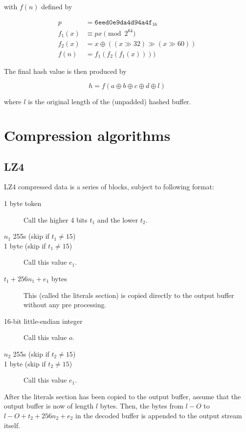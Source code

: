 \documentclass[11pt,a4paper]{report}
\begin{document}
        with $f(n)$ defined by

        \begin{align*}
            p      &=      \texttt{6eed0e9da4d94a4f}_{16} \\
            f_1(x) &\equiv px \pmod{2^{64}} \\
            f_2(x) &=      x \oplus ((x \gg 32) \gg (x \gg 60)) \\
            f(n)   &=      f_1(f_2(f_1(x))))
        \end{align*}

        The final hash value is then produced by

        $$h = f(a \oplus b \oplus c \oplus d \oplus l) $$

        where $l$ is the original length of the (unpadded) hashed buffer.

    \section{Compression algorithms}
        \subsection{LZ4}
        \label{compression:lz4}
        LZ4 compressed data is a series of blocks, subject to following format:

        \begin{description}
            \item [1 byte token] Call the higher 4 bits $t_1$ and the lower $t_2$.
            \item [$n_1$ 255s (skip if $t_1 \neq 15$)]
            \item [1 byte (skip if $t_1 \neq 15$)] Call this value $e_1$.
            \item [$t_1 + 256n_1 + e_1$ bytes] This (called the literals
                section) is copied directly to the output buffer without any
                pre processing.
            \item [16-bit little-endian integer] Call this value $o$.
            \item [$n_2$ 255s (skip if $t_2 \neq 15$)]
            \item [1 byte (skip if $t_2 \neq 15$)] Call this value $e_1$.
        \end{description}

        After the literals section has been copied to the output buffer, assume
        that the output buffer is now of length $l$ bytes. Then, the bytes from
        $l - O$ to $l - O + t_2 + 256n_2 + e_2$ in the decoded buffer is
        appended to the output stream itself.
\end{document}
